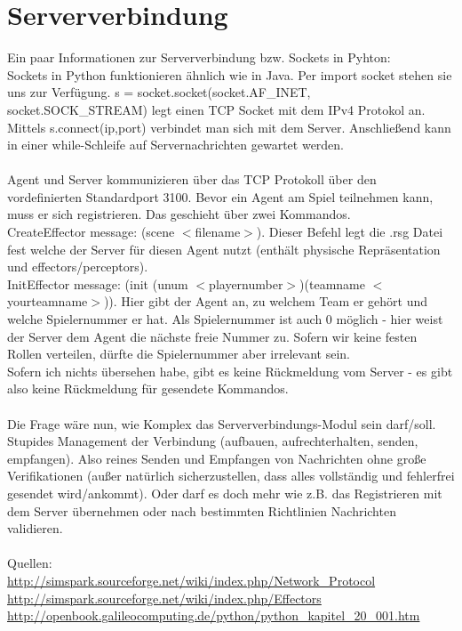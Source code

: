 \section{Serververbindung}
Ein paar Informationen zur Serververbindung bzw. Sockets in Pyhton:\\
Sockets in Python funktionieren ähnlich wie in Java. Per \grqq import socket\grqq{} stehen sie uns zur Verfügung. s = socket.socket(socket.AF\_INET, socket.SOCK\_STREAM) legt einen TCP Socket mit dem IPv4 Protokol an. Mittels s.connect(ip,port) verbindet man sich mit dem Server. Anschließend kann in einer while-Schleife auf Servernachrichten gewartet werden.\\
\\
Agent und Server kommunizieren über das TCP Protokoll über den vordefinierten Standardport 3100. Bevor ein Agent am Spiel teilnehmen kann, muss er sich \grqq registrieren\grqq{}. Das geschieht über zwei Kommandos.\\
CreateEffector message: (scene $<$filename$>$). Dieser Befehl legt die .rsg Datei fest welche der Server für diesen Agent nutzt (enthält physische Repräsentation und effectors/perceptors).\\
InitEffector message: (init (unum $<$playernumber$>$)(teamname $<$yourteamname$>$)). Hier gibt der Agent an, zu welchem Team er gehört und welche Spielernummer er hat. Als Spielernummer ist auch 0 möglich - hier weist der Server dem Agent die nächste freie Nummer zu. Sofern wir keine festen Rollen verteilen, dürfte die Spielernummer aber irrelevant sein.\\
Sofern ich nichts übersehen habe, gibt es keine Rückmeldung vom Server - es gibt also keine Rückmeldung für gesendete Kommandos.\\
\\
Die Frage wäre nun, wie Komplex das Serververbindungs-Modul sein darf/soll. Stupides Management der Verbindung (aufbauen, aufrechterhalten, senden, empfangen). Also reines Senden und Empfangen von Nachrichten ohne große Verifikationen (außer natürlich sicherzustellen, dass alles vollständig und fehlerfrei gesendet wird/ankommt). Oder darf es doch mehr wie z.B. das Registrieren mit dem Server übernehmen oder nach bestimmten Richtlinien Nachrichten validieren.\\
\\
Quellen:\\
\url{http://simspark.sourceforge.net/wiki/index.php/Network\_Protocol}\\
\url{http://simspark.sourceforge.net/wiki/index.php/Effectors}\\
\url{http://openbook.galileocomputing.de/python/python\_kapitel\_20\_001.htm}\\